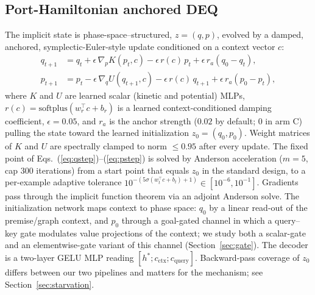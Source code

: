 \documentclass[11pt]{article}
\newcommand{\hstar}{h^{*}}
\newcommand{\zzero}{z_{0}}
\begin{document}
\subsection{Port-Hamiltonian anchored DEQ}
The implicit state is phase-space--structured, $z=(q,p)$, evolved by a
damped, anchored, symplectic-Euler-style update conditioned on a
context vector $c$:
\begin{align}
q_{t+1} &= q_t + \epsilon\,\nabla_p K(p_t, c) - \epsilon\, r(c)\, p_t
          + \epsilon\, r_a (q_0 - q_t),\label{eq:qstep}\\
p_{t+1} &= p_t - \epsilon\,\nabla_q U(q_{t+1}, c) - \epsilon\, r(c)\, q_{t+1}
          + \epsilon\, r_a (p_0 - p_t),\label{eq:pstep}
\end{align}
where $K$ and $U$ are learned scalar (kinetic and potential) MLPs,
$r(c)=\mathrm{softplus}(w_r^\top c + b_r)$ is a learned
context-conditioned damping coefficient, $\epsilon=0.05$, and
$r_a$ is the anchor strength ($0.02$ by default; $0$ in arm C) pulling
the state toward the learned initialization
$\zzero=(q_0,p_0)$. Weight matrices of $K$ and $U$ are spectrally
clamped to norm $\le 0.95$ after every update. The fixed point of
Eqs.~(\ref{eq:qstep})--(\ref{eq:pstep}) is solved by Anderson
acceleration ($m{=}5$, cap $300$ iterations) from a start point that
equals $\zzero$ in the standard design, to a per-example adaptive
tolerance $10^{-(5\sigma(w_t^\top c + b_t)+1)}\in[10^{-6},10^{-1}]$.
Gradients pass through the implicit function theorem via an adjoint
Anderson solve. The initialization network maps context to phase
space: $q_0$ by a linear read-out of the premise/graph context, and
$p_0$ through a goal-gated channel in which a query--key gate modulates
value projections of the context; we study both a scalar-gate and an
elementwise-gate variant of this channel
(Section~\ref{sec:gate}). The decoder is a two-layer GELU MLP reading
$[\hstar; c_{\text{ctx}}; c_{\text{query}}]$. Backward-pass coverage
of $\zzero$ differs between our two pipelines and matters for the
mechanism; see Section~\ref{sec:starvation}.
\end{document}
